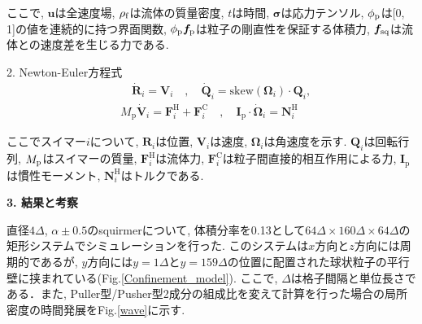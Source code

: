 \documentclass[twocolumns,10pt,a4j]{jarticle}
\begin{document}
   \noindent
       ここで, $\boldsymbol u $は全速度場, $\rho_{\rm f}$は流体の質量密度, $t$は時間, $\boldsymbol{\sigma}$は応力テンソル, $\phi_{\rm p}$は[0, 1]の値を連続的に持つ界面関数, $\phi_{\rm p}\boldsymbol{f}_{\rm p}$は粒子の剛直性を保証する体積力, $\boldsymbol{f}_{\rm sq}$は流体との速度差を生じる力である.
\par2. Newton-Euler方程式\\
   \vspace{-6truemm}
     \begin{equation}
       \begin{split}
	 &\quad\dot{\boldsymbol{R}}_i = \boldsymbol{V}_i
	   \quad , \quad
	 \dot{\boldsymbol{Q}}_i = \text{skew}(\boldsymbol{\Omega}_i)\cdot \boldsymbol{Q}_i,
	   	   \\
	  &M_{\text{p}}\dot{\boldsymbol{V}}_i = \boldsymbol{F}_i^{\text{H}}+\boldsymbol{F}_i^{\text{C}}
	   \quad , \quad
	  \boldsymbol{I}_{\text{p}}\cdot\dot{\boldsymbol{\Omega}}_i = \boldsymbol{N}_i^{\text{H}}
	 \end{split}
	 \label{Newton_Euler}
       \end{equation}
     \vspace{-4truemm}
       
       \noindent
       ここでスイマー$i$について, $\boldsymbol{R}_i$は位置, $\boldsymbol{V}_i$は速度, $\boldsymbol{\Omega}_i$は角速度を示す. $\boldsymbol{Q}_i$は回転行列,  $M_{\rm p}$はスイマーの質量, $\boldsymbol{F}_i^{\text{H}}$は流体力, $\boldsymbol{F}_i^{\text{C}}$は粒子間直接的相互作用による力, $\boldsymbol{I}_{\text{p}}$は慣性モーメント, $\boldsymbol{N}_i^{\text{H}}$はトルクである.

    \noindent
        {\bf \large 3. 結果と考察}
\par
直径$4\Delta$, $\alpha\pm0.5$のsquirmerについて, 体積分率を0.13として$64\Delta×\!\!160\Delta×\!\!64\Delta$の矩形システムでシミュレーションを行った. このシステムは$x$方向と$z$方向には周期的であるが, $y$方向には$y =1\Delta$と$y=159\Delta$の位置に配置された球状粒子の平行壁に挟まれている(Fig.\ref{Confinement_model}). ここで, $\Delta$は格子間隔と単位長さである．また, Puller型/Pusher型2成分の組成比を変えて計算を行った場合の局所密度の時間発展をFig.\ref{wave}に示す.
\end{document}
